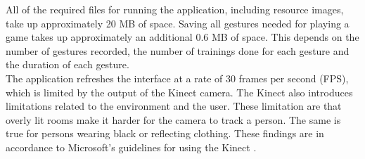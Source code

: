 All of the required files for running the application, including resource images, take up approximately 20 MB of space. Saving all gestures needed for playing a game takes up approximately an additional 0.6 MB of space. This depends on the number of gestures recorded, the number of trainings done for each gesture and the duration of each gesture.\\

The application refreshes the interface at a rate of 30 frames per second (FPS), which is limited by the output of the Kinect camera. The Kinect also introduces limitations related to the environment and the user. These limitation are that overly lit rooms make it harder for the camera to track a person. The same is true for persons wearing black or reflecting clothing. These findings are in accordance to Microsoft's guidelines for using the Kinect \cite{MicrosoftGuidelines}.
